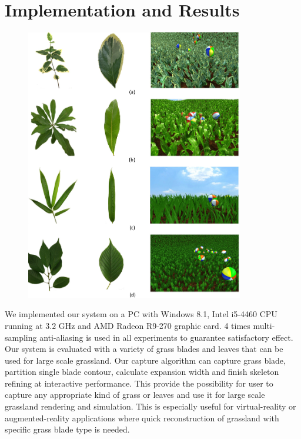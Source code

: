 \documentclass[10pt,journal,compsoc]{IEEEtran}
\begin{document}
\section{Implementation and Results}
\begin{figure}
    \centering
    \includegraphics[width=0.85\textwidth]{figs/results.jpg}
    \label{fig:results}
\end{figure}

We implemented our system on a PC with Windows 8.1, Intel i5-4460 CPU running at $3.2$ GHz and AMD Radeon R9-270 graphic card. 4 times multi-sampling anti-aliasing is used in all experiments to guarantee satisfactory effect.\\

Our system is evaluated with a variety of grass blades and leaves that can be used for large scale grassland. Our capture algorithm can capture grass blade, partition single blade contour, calculate expansion width and finish skeleton refining at interactive performance. This provide the possibility for user to capture any appropriate kind of grass or leaves and use it for large scale grassland rendering and simulation. This is especially useful for virtual-reality or augmented-reality applications where quick reconstruction of grassland with specific grass blade type is needed. \\
\end{document}
